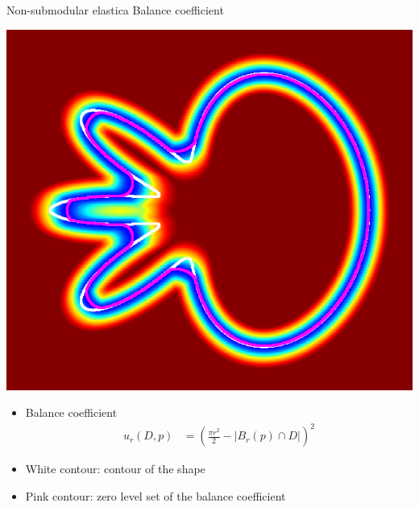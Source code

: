 \begin{frame}
\end{frame}

\begin{frame}
{Non-submodular elastica}
{Balance coefficient}
\begin{minipage}{0.5\textwidth}
\center
\includegraphics[scale=0.2]{figures/non-submodular-elastica/balance-coefficient-zero-level-set.png}
\end{minipage}
\begin{minipage}{0.49\textwidth}
\footnotesize
\begin{itemize}
\item{Balance coefficient}
\begin{align*}
u_r(D,p) &= \left( \frac{\pi r^2}{2} - |B_r(p) \cap D| \right)^2
\end{align*}
\item{White contour: contour of the shape}
\item{Pink contour: zero level set of the balance coefficient}
\end{itemize}
\end{minipage}
\end{frame}


